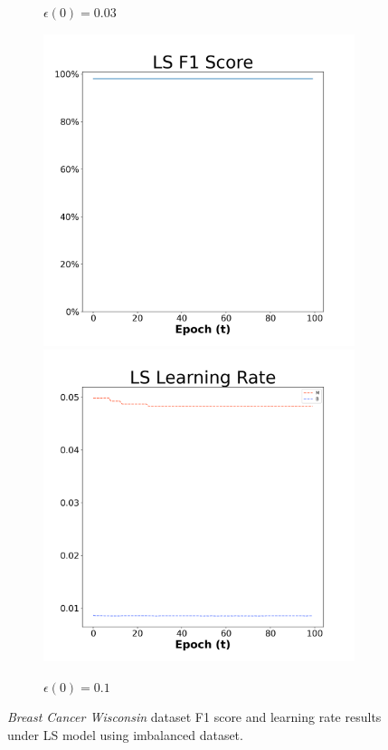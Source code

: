 \begin{figure}[H]
\begin{subfigure}{0.3\textwidth}
  \caption{$\epsilon(0)=0.03$}
\end{subfigure}\hfil %
\begin{subfigure}{0.3\textwidth}
  \includegraphics[width=\linewidth]{images/exper2/breast/LS_0.1_f1.png}
  \includegraphics[width=\linewidth]{images/exper2/breast/LS_0.1_lr.png}
  \caption{$\epsilon(0)=0.1$}
\end{subfigure}

\caption{\textit{Breast Cancer Wisconsin} dataset F1 score and learning rate results under LS model using imbalanced dataset.}
\end{figure}

